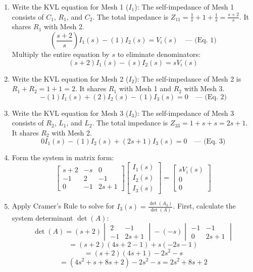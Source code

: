 \documentclass[11pt]{article}
\begin{document}
\begin{enumerate}[label=(\alph*), itemindent=*, leftmargin=*, nolistsep]

    \item Write the KVL equation for Mesh 1 ($I_1$):
    The self-impedance of Mesh 1 consists of $C_1$, $R_1$, and $C_2$. The total impedance is $Z_{11} = \frac{1}{s} + 1 + \frac{1}{s} = \frac{s+2}{s}$. It shares $R_1$ with Mesh 2.
    \[
    \left( \frac{s+2}{s} \right)I_1(s) - (1)I_2(s) = V_i(s) \quad \text{--- (Eq. 1)}
    \]
    Multiply the entire equation by $s$ to eliminate denominators:
    \[
    (s + 2)I_1(s) - (s)I_2(s) = sV_i(s)
    \]

    \item Write the KVL equation for Mesh 2 ($I_2$):
    The self-impedance of Mesh 2 is $R_1 + R_2 = 1 + 1 = 2$. It shares $R_1$ with Mesh 1 and $R_2$ with Mesh 3.
    \[
    -(1)I_1(s) + (2)I_2(s) - (1)I_3(s) = 0 \quad \text{--- (Eq. 2)}
    \]

    \item Write the KVL equation for Mesh 3 ($I_3$):
    The self-impedance of Mesh 3 consists of $R_2$, $L_1$, and $L_2$. The total impedance is $Z_{33} = 1 + s + s = 2s + 1$. It shares $R_2$ with Mesh 2.
    \[
    0I_1(s) - (1)I_2(s) + (2s + 1)I_3(s) = 0 \quad \text{--- (Eq. 3)}
    \]

    \item Form the system in matrix form:
    \[
    \begin{bmatrix}
    s + 2 & -s & 0 \\
    -1 & 2 & -1 \\
    0 & -1 & 2s + 1
    \end{bmatrix}
    \begin{bmatrix}
    I_1(s) \\
    I_2(s) \\
    I_3(s)
    \end{bmatrix}
    =
    \begin{bmatrix}
    sV_i(s) \\
    0 \\
    0
    \end{bmatrix}
    \]

    \item Apply Cramer's Rule to solve for $I_3(s) = \frac{\det(A_3)}{\det(A)}$. First, calculate the system determinant $\det(A)$:
    \[
    \det(A) = (s + 2) \begin{vmatrix} 2 & -1 \\ -1 & 2s + 1 \end{vmatrix} - (-s) \begin{vmatrix} -1 & -1 \\ 0 & 2s + 1 \end{vmatrix}
    \]
    \[
    = (s + 2)(4s + 2 - 1) + s(-2s - 1)
    \]
    \[
    = (s + 2)(4s + 1) - 2s^2 - s
    \]
    \[
    = (4s^2 + s + 8s + 2) - 2s^2 - s = 2s^2 + 8s + 2
    \]


\end{enumerate}
\end{document}
